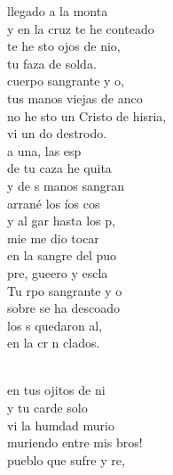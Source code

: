 \begin{cancion}%
	llegado a la monta\\
	y en la cruz te he conteado\\
	te he sto ojos de nio,\\
	tu faza de solda.\\
\jump
	cuerpo sangrante y o,\\
	tus manos viejas de anco\\
	no he sto un Cristo de hisria,\\
	vi un do destrodo.\\
\jump
	 a una, las esp\\
	de tu caza he quita\\
	y de s manos sangran\\
	arrané los íos cos\\
	y al gar hasta los p,\\
	mie me dio tocar\\
	en la sangre del puo\\
	pre, gueero y escla\\
\jump
	Tu rpo sangrante y o\\
	sobre  se ha descoado\\
	los s quedaron al, \\
	en la cr n clados.\\\jump\\
	\begin{chorus}%
	en tus ojitos de ni\\
	y tu carde solo\\
	vi la humdad murio\\
	muriendo entre mis bros!\\
	 pueblo que sufre y re,\\

\end{chorus}
\end{cancion}
